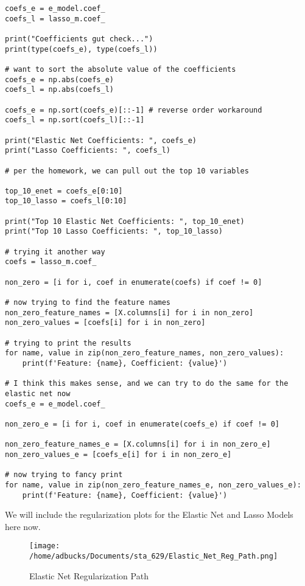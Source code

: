 \documentclass[12pt, letterpaper]{article}
\begin{document}
\begin{verbatim}
coefs_e = e_model.coef_ 
coefs_l = lasso_m.coef_

print("Coefficients gut check...")
print(type(coefs_e), type(coefs_l))

# want to sort the absolute value of the coefficients 
coefs_e = np.abs(coefs_e) 
coefs_l = np.abs(coefs_l) 

coefs_e = np.sort(coefs_e)[::-1] # reverse order workaround 
coefs_l = np.sort(coefs_l)[::-1] 

print("Elastic Net Coefficients: ", coefs_e) 
print("Lasso Coefficients: ", coefs_l) 

# per the homework, we can pull out the top 10 variables 

top_10_enet = coefs_e[0:10] 
top_10_lasso = coefs_l[0:10] 

print("Top 10 Elastic Net Coefficients: ", top_10_enet) 
print("Top 10 Lasso Coefficients: ", top_10_lasso) 

# trying it another way 
coefs = lasso_m.coef_  

non_zero = [i for i, coef in enumerate(coefs) if coef != 0]

# now trying to find the feature names 
non_zero_feature_names = [X.columns[i] for i in non_zero]
non_zero_values = [coefs[i] for i in non_zero]

# trying to print the results 
for name, value in zip(non_zero_feature_names, non_zero_values):
    print(f'Feature: {name}, Coefficient: {value}')

# I think this makes sense, and we can try to do the same for the elastic net now 
coefs_e = e_model.coef_

non_zero_e = [i for i, coef in enumerate(coefs_e) if coef != 0]

non_zero_feature_names_e = [X.columns[i] for i in non_zero_e]
non_zero_values_e = [coefs_e[i] for i in non_zero_e]

# now trying to fancy print 
for name, value in zip(non_zero_feature_names_e, non_zero_values_e):
    print(f'Feature: {name}, Coefficient: {value}')

\end{verbatim}

We will include the regularization plots for the Elastic Net and Lasso Models here now. 

\begin{figure} 
\texttt{[image: /home/adbucks/Documents/sta\_629/Elastic\_Net\_Reg\_Path.png]} 
\caption{Elastic Net Regularization Path} 
\end{figure} 
\end{document}
